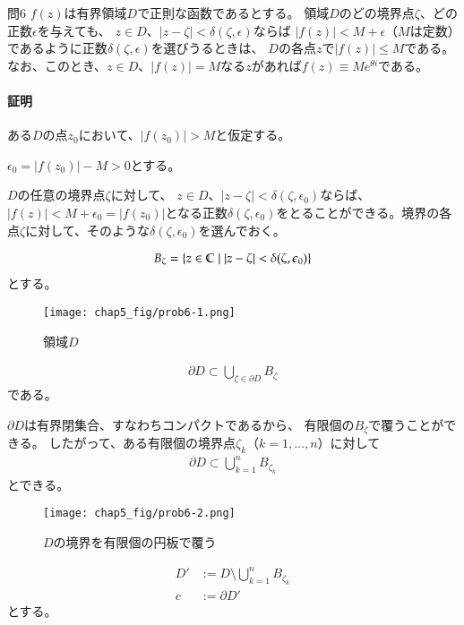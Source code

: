 \begin{mysimplebox}{問6}
    $f(z)$は有界領域$D$で正則な函数であるとする。
    領域$D$のどの境界点$\zeta$、どの正数$\epsilon$を与えても、
    $z\in D$、$|z-\zeta|<\delta(\zeta,\epsilon)$ならば
    $|f(z)|<M+\epsilon$（$M$は定数）であるように正数$\delta(\zeta,\epsilon)$を選びうるときは、
    $D$の各点$z$で$|f(z)|\le M$である。
    なお、このとき、$z\in D$、$|f(z)|=M$なる$z$があれば$f(z)\equiv Me^{\theta i}$である。
\end{mysimplebox}
\paragraph{証明}
ある$D$の点$z_0$において、$|f(z_0)|>M$と仮定する。

$\epsilon_0=|f(z_0)|-M>0$とする。

$D$の任意の境界点$\zeta$に対して、
$z\in D$、$|z-\zeta|<\delta(\zeta,\epsilon_0)$ならば、
$|f(z)|<M+\epsilon_0=|f(z_0)|$となる正数$\delta(\zeta,\epsilon_0)$をとることができる。境界の各点$\zeta$に対して、そのような$\delta(\zeta,\epsilon_0)$を選んでおく。

\begin{align*}
    B_\zeta=\{z\in\mathbb{C}\mid|z-\zeta|<\delta(\zeta,\epsilon_0)\}
\end{align*}
とする。

\begin{figure}[h]
    \centering
    \texttt{[image: chap5\_fig/prob6-1.png]}
    \caption{領域$D$}
    \label{fig:chap5-6-1}
\end{figure}

\begin{align*}
    \partial D\subset\bigcup_{\zeta\in\partial D}B_\zeta
\end{align*}
である。

$\partial D$は有界閉集合、すなわちコンパクトであるから、
有限個の$B_\zeta$で覆うことができる。
したがって、ある有限個の境界点$\zeta_k$（$k=1,\dots,n$）に対して
\begin{align*}
    \partial D\subset\bigcup_{k=1}^{n}B_{\zeta_k}
\end{align*}
とできる。

\begin{figure}[h]
    \centering
    \texttt{[image: chap5\_fig/prob6-2.png]}
    \caption{$D$の境界を有限個の円板で覆う}
    \label{fig:chap5-6-2}
\end{figure}

\begin{align*}
    D'&:=D\setminus\bigcup_{k=1}^{n}B_{\zeta_k}\\
    c&:=\partial D'
\end{align*}
とする。


